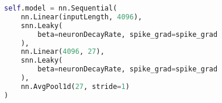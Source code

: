 \begin{lstlisting}[language=Python, caption={SNN architecture}]
self.model = nn.Sequential(
	nn.Linear(inputLength, 4096),
	snn.Leaky(
		beta=neuronDecayRate, spike_grad=spike_grad
	),
	nn.Linear(4096, 27),
	snn.Leaky(
		beta=neuronDecayRate, spike_grad=spike_grad
	),
	nn.AvgPool1d(27, stride=1)
)
\end{lstlisting}